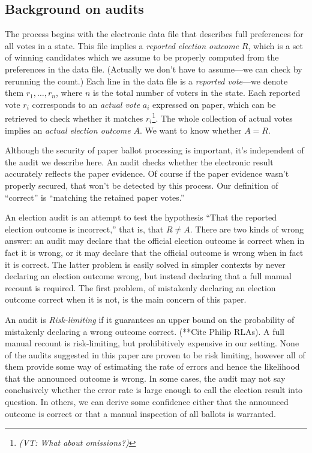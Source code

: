 \documentclass[10pt,a4paper]{article}
\newcommand{\VTNote}[1]{{\it(VT: #1)}}
\begin{document}
\subsection{Background on audits}
The process begins with the electronic data file that describes full preferences for all votes in a state.  This file implies a \emph{reported election outcome} $R$, which is a set of winning candidates which we assume to be properly computed from the preferences in the data file.  (Actually we don't have to assume---we can check by rerunning the count.)  Each line in the data file is a \emph{reported vote}---we denote them $r_1,\ldots,r_n$, where $n$ is the total number of voters in the state.  Each reported vote $r_i$ corresponds to an \emph{actual vote} $a_i$ expressed on paper, which can be retrieved to check whether it matches $r_i$\footnote{\VTNote{What about omissions?}}.   The whole collection of actual votes implies an \emph{actual election outcome} $A$.  We want to know whether $A = R$.

Although the security of paper ballot processing is important, it's independent of the audit we describe here.  An audit checks whether the electronic result accurately reflects the paper evidence.  Of course if the paper evidence wasn't properly secured, that won't be detected by this process.  Our definition of ``correct'' is ``matching the retained paper votes.''

An election audit is an attempt to test the hypothesis ``That the reported election outcome is incorrect,'' that is, that $R \neq A$.  There are two kinds of wrong answer: an audit may declare that the official election outcome is correct when in fact it is wrong, or it may declare that the official outcome is wrong when in fact it is correct.  The latter problem is easily solved in simpler contexts by never declaring an election outcome wrong, but instead declaring that a full manual recount is required.  The first problem, of mistakenly declaring an election outcome correct when it is not, is the main concern of this paper.

An audit is \emph{Risk-limiting} if it guarantees an upper bound on the probability of mistakenly declaring a wrong outcome correct. (**Cite Philip RLAs).  A full manual recount is risk-limiting, but prohibitively expensive in our setting.  None of the audits suggested in this paper are proven to be risk limiting, however all of them provide some way of estimating the rate of errors and hence the likelihood that the announced outcome is wrong.  In some cases, the audit may not say conclusively whether the error rate is large enough to call the election result into question.  In others, we can derive some confidence either that the announced outcome is correct or that a manual inspection of all ballots is warranted.
\end{document}

